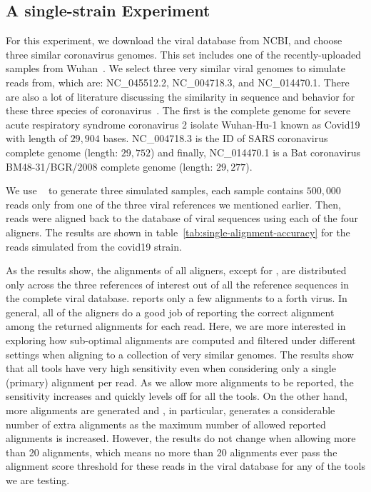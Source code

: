 \subsection{A single-strain Experiment}

For this experiment, we download the viral database from NCBI,
and choose three similar coronavirus genomes.
This set includes one of the recently-uploaded samples from Wuhan~\citep{wu2020new,baranov2005programmed}.
We select three very similar viral genomes to simulate reads from, which are: NC\_045512.2, NC\_004718.3, 
and NC\_014470.1. There are also a lot of literature discussing the similarity in sequence and behavior for 
these three species of coronavirus~\citep{wang2020unique,zhang2020probable,tang2020origin}.
The first is the complete genome for severe acute respiratory syndrome coronavirus 2 isolate Wuhan-Hu-1
known as Covid19 with length of $29,904$ bases. NC\_004718.3 is the ID of SARS coronavirus complete genome 
(length: $29,752$) and finally, NC\_014470.1 is a Bat coronavirus BM48-31/BGR/2008 complete genome 
(length: $29,277$).

We use \mason~\citep{holtgrewe2010mason} to generate three simulated samples,
each sample contains $500,000$ reads only from one of the three viral references 
we mentioned earlier. Then, reads were aligned back to the database of viral 
sequences using each of the four aligners. The results are shown in 
table~\ref{tab:single-alignment-accuracy} for the reads simulated from the covid19 strain.

As the results show, the alignments of all aligners, except for \debga, are distributed only 
across the three references of interest out of all the reference sequences in the complete viral database.
\debga reports only a few alignments to a forth virus.  In general, all of the aligners do 
a good job of reporting the correct alignment among the returned alignments for each read.
Here, we are more interested in exploring how sub-optimal alignments are computed and 
filtered under different settings when aligning to a collection of very similar genomes.
The results show that all tools have very high sensitivity even when considering only 
a single (primary) alignment per read.  As we allow more alignments to be reported, 
the sensitivity increases and quickly levels off for all the tools.  On the other hand, 
more alignments are generated and \bt, in particular, generates a considerable number 
of extra alignments as the maximum number of allowed reported alignments is increased.
However, the results do not change when allowing more than 20 alignments, 
which means no more than 20 alignments ever pass the alignment score threshold for these reads in the 
viral database for any of the tools we are testing. 
    
